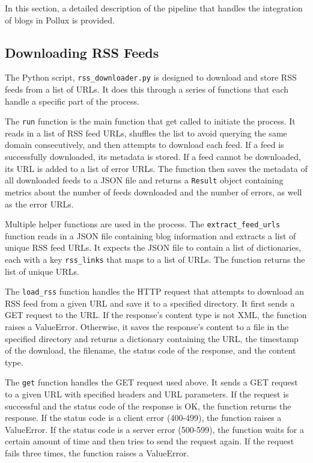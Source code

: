 \documentclass{article}
\begin{document}
In this section, a detailed description of the pipeline that handles the integration of blogs in Pollux is provided.

\subsection{Downloading RSS Feeds}

The Python script, \texttt{rss\_downloader.py} is designed to download and store RSS feeds from a list of URLs. It does this through a series of functions that each handle a specific part of the process.

The \texttt{run} function is the main function that get called to initiate the process. It reads in a list of RSS feed URLs, shuffles the list to avoid querying the same domain consecutively, and then attempts to download each feed. If a feed is successfully downloaded, its metadata is stored. If a feed cannot be downloaded, its URL is added to a list of error URLs. The function then saves the metadata of all downloaded feeds to a JSON file and returns a \texttt{Result} object containing metrics about the number of feeds downloaded and the number of errors, as well as the error URLs.

Multiple helper functions are used in the process. The \texttt{extract\_feed\_urls} function reads in a JSON file containing blog information and extracts a list of unique RSS feed URLs. It expects the JSON file to contain a list of dictionaries, each with a key \texttt{rss\_links} that maps to a list of URLs. The function returns the list of unique URLs.

The \texttt{load\_rss} function handles the HTTP request that attempts to download an RSS feed from a given URL and save it to a specified directory. It first sends a GET request to the URL. If the response's content type is not XML, the function raises a ValueError. Otherwise, it saves the response's content to a file in the specified directory and returns a dictionary containing the URL, the timestamp of the download, the filename, the status code of the response, and the content type.

The \texttt{get} function handles the GET request used above. It sends a GET request to a given URL with specified headers and URL parameters. If the request is successful and the status code of the response is OK, the function returns the response. If the status code is a client error (400-499), the function raises a ValueError. If the status code is a server error (500-599), the function waits for a certain amount of time and then tries to send the request again. If the request fails three times, the function raises a ValueError.
\end{document}

